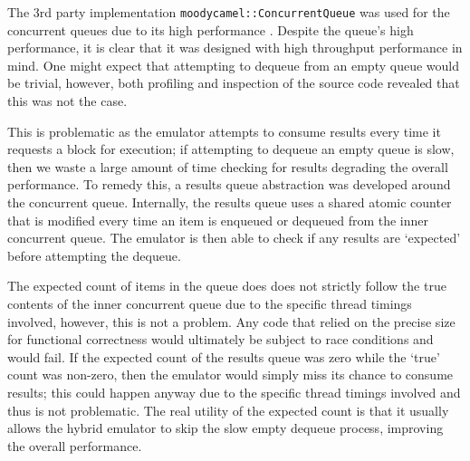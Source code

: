 The 3rd party implementation \texttt{moodycamel::ConcurrentQueue} \cite{moodycamel} was used for the concurrent queues due to its high performance \cite{moodycamel-benchmark}. Despite the queue's high performance, it is clear that it was designed with high throughput performance in mind. One might expect that attempting to dequeue from an empty queue would be trivial, however, both profiling and inspection of the source code revealed that this was not the case.

This is problematic as the emulator attempts to consume results every time it requests a block for execution; if attempting to dequeue an empty queue is slow, then we waste a large amount of time checking for results degrading the overall performance. To remedy this, a results queue abstraction was developed around the concurrent queue. Internally, the results queue uses a shared atomic counter \cite{cpp-atomic} that is modified every time an item is enqueued or dequeued from the inner concurrent queue. The emulator is then able to check if any results are `expected' before attempting the dequeue.

The expected count of items in the queue does does not strictly follow the true contents of the inner concurrent queue due to the specific thread timings involved, however, this is not a problem. Any code that relied on the precise size for functional correctness would ultimately be subject to race conditions and would fail. If the expected count of the results queue was zero while the `true' count was non-zero, then the emulator would simply miss its chance to consume results; this could happen anyway due to the specific thread timings involved and thus is not problematic. The real utility of the expected count is that it usually allows the hybrid emulator to skip the slow empty dequeue process, improving the overall performance.